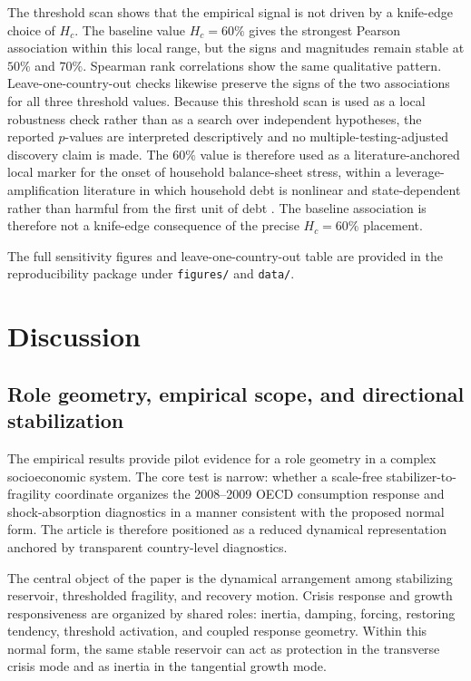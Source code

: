 \documentclass[11pt]{article}
\begin{document}
The threshold scan shows that the empirical signal is not driven by a knife-edge choice of $H_c$. The baseline value $H_c=60\%$ gives the strongest Pearson association within this local range, but the signs and magnitudes remain stable at $50\%$ and $70\%$. Spearman rank correlations show the same qualitative pattern. Leave-one-country-out checks likewise preserve the signs of the two associations for all three threshold values. Because this threshold scan is used as a local robustness check rather than as a search over independent hypotheses, the reported $p$-values are interpreted descriptively and no multiple-testing-adjusted discovery claim is made. The $60\%$ value is therefore used as a literature-anchored local marker for the onset of household balance-sheet stress, within a leverage-amplification literature in which household debt is nonlinear and state-dependent rather than harmful from the first unit of debt \cite{MianSufiVerner2017,KumhofRanciereWinant2015,JordaSchularickTaylor2013}. The baseline association is therefore not a knife-edge consequence of the precise $H_c=60\%$ placement.

The full sensitivity figures and leave-one-country-out table are provided in the reproducibility package under \texttt{figures/} and \texttt{data/}.

\section{Discussion}
\subsection{Role geometry, empirical scope, and directional stabilization}
The empirical results provide pilot evidence for a role geometry in a complex socioeconomic system. The core test is narrow: whether a scale-free stabilizer-to-fragility coordinate organizes the 2008--2009 OECD consumption response and shock-absorption diagnostics in a manner consistent with the proposed normal form. The article is therefore positioned as a reduced dynamical representation anchored by transparent country-level diagnostics.

The central object of the paper is the dynamical arrangement among stabilizing reservoir, thresholded fragility, and recovery motion. Crisis response and growth responsiveness are organized by shared roles: inertia, damping, forcing, restoring tendency, threshold activation, and coupled response geometry. Within this normal form, the same stable reservoir can act as protection in the transverse crisis mode and as inertia in the tangential growth mode.
\end{document}
